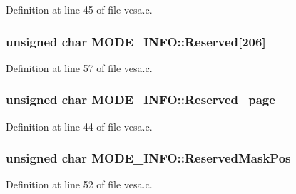 Definition at line 45 of file vesa.\+c.

\subsubsection[{\texorpdfstring{Reserved}{Reserved}}]{\setlength{\rightskip}{0pt plus 5cm}unsigned char M\+O\+D\+E\+\_\+\+I\+N\+F\+O\+::\+Reserved\mbox{[}206\mbox{]}}\hypertarget{structMODE__INFO_afed368ddd295ce1d5f6ee6c7f0e745a5}{}\label{structMODE__INFO_afed368ddd295ce1d5f6ee6c7f0e745a5}


Definition at line 57 of file vesa.\+c.

\subsubsection[{\texorpdfstring{Reserved\+\_\+page}{Reserved_page}}]{\setlength{\rightskip}{0pt plus 5cm}unsigned char M\+O\+D\+E\+\_\+\+I\+N\+F\+O\+::\+Reserved\+\_\+page}\hypertarget{structMODE__INFO_ae271e35fb165aea98b15a79ea692c237}{}\label{structMODE__INFO_ae271e35fb165aea98b15a79ea692c237}


Definition at line 44 of file vesa.\+c.

\subsubsection[{\texorpdfstring{Reserved\+Mask\+Pos}{ReservedMaskPos}}]{\setlength{\rightskip}{0pt plus 5cm}unsigned char M\+O\+D\+E\+\_\+\+I\+N\+F\+O\+::\+Reserved\+Mask\+Pos}\hypertarget{structMODE__INFO_adaa96a124ba7fecf2c5930779e289183}{}\label{structMODE__INFO_adaa96a124ba7fecf2c5930779e289183}


Definition at line 52 of file vesa.\+c.

